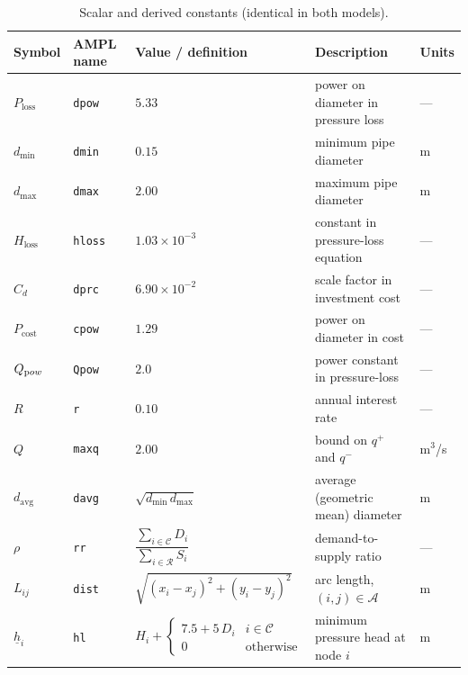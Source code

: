 \documentclass[11pt]{article}
\newcommand{\ampl}[1]{\texttt{#1}}
\newcommand{\qp}{q^{+}}
\newcommand{\qn}{q^{-}}
\begin{document}
\begin{table}[htbp]
  \centering
  \caption{Scalar and derived constants (identical in both models).}
  \label{tab:constants}
  \begin{tabular}{l l l >{\raggedright\arraybackslash}p{3.6cm} l}
    \toprule
    Symbol & AMPL name & Value / definition & Description & Units \\
    \midrule
    $P_{\text{loss}}$ & \ampl{dpow}  & $5.33$                  & power on diameter in pressure loss & --- \\
    $d_{\min}$ & \ampl{dmin}  & $0.15$                       & minimum pipe diameter              & m \\
    $d_{\max}$ & \ampl{dmax}  & $2.00$                       & maximum pipe diameter              & m \\
    $H_{\text{loss}}$ & \ampl{hloss} & $1.03\times10^{-3}$   & constant in pressure-loss equation & --- \\
    $C_d$      & \ampl{dprc}  & $6.90\times10^{-2}$          & scale factor in investment cost    & --- \\
    $P_{\text{cost}}$ & \ampl{cpow}  & $1.29$                & power on diameter in cost          & --- \\
    $Q_{\text pow}$ & \ampl{Qpow}  & $2.0$                & power constant in pressure-loss          & --- \\
    $R$        & \ampl{r}     & $0.10$                       & annual interest rate                      & --- \\
    $Q$        & \ampl{maxq}  & $2.00$                       & bound on $\qp$ and $\qn$           & m$^3$/s \\
    \addlinespace
    $d_{\text{avg}}$ & \ampl{davg} & $\sqrt{d_{\min}\,d_{\max}}$ & average (geometric mean) diameter & m \\
    $\rho$ & \ampl{rr} & $\dfrac{\sum_{i\in\mathcal{C}} D_i}{\sum_{i\in\mathcal{R}} S_i}$ & demand-to-supply ratio & --- \\
    $L_{ij}$ & \ampl{dist} & $\sqrt{(x_i-x_j)^2+(y_i-y_j)^2}$ & arc length, $(i,j)\in\mathcal{A}$ & m \\
    $\underline{h}_i$ & \ampl{hl} & $H_i+\!\begin{cases}7.5+5\,D_i & i\in\mathcal{C}\\ 0 & \text{otherwise}\end{cases}$ & minimum pressure head at node $i$ & m \\
    \bottomrule
  \end{tabular}
\end{table}
\end{document}
